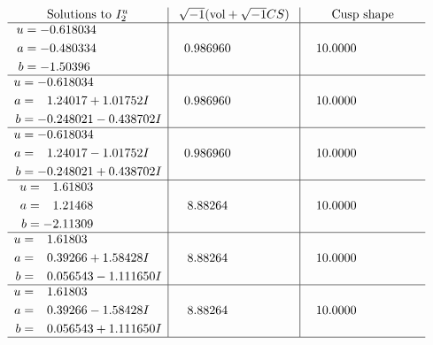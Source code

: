 \documentclass[1p]{elsarticle_modified}
\theoremstyle{definition}
\newcommand{\I}{\sqrt{-1}}
\begin{document}
$$\begin{array}{c|c|c}  
\text{Solutions to }I^u_{2}& \I (\text{vol} + \sqrt{-1}CS) & \text{Cusp shape}\\
 \hline 
\begin{aligned}
u &= -0.618034\phantom{ +0.000000I} \\
a &= -0.480334\phantom{ +0.000000I} \\
b &= -1.50396\phantom{ +0.000000I}\end{aligned}
 & \phantom{-}0.986960\phantom{ +0.000000I} & \phantom{-}10.0000\phantom{ +0.000000I} \\ \hline\begin{aligned}
u &= -0.618034\phantom{ +0.000000I} \\
a &= \phantom{-}1.24017 + 1.01752 I \\
b &= -0.248021 - 0.438702 I\end{aligned}
 & \phantom{-}0.986960\phantom{ +0.000000I} & \phantom{-}10.0000\phantom{ +0.000000I} \\ \hline\begin{aligned}
u &= -0.618034\phantom{ +0.000000I} \\
a &= \phantom{-}1.24017 - 1.01752 I \\
b &= -0.248021 + 0.438702 I\end{aligned}
 & \phantom{-}0.986960\phantom{ +0.000000I} & \phantom{-}10.0000\phantom{ +0.000000I} \\ \hline\begin{aligned}
u &= \phantom{-}1.61803\phantom{ +0.000000I} \\
a &= \phantom{-}1.21468\phantom{ +0.000000I} \\
b &= -2.11309\phantom{ +0.000000I}\end{aligned}
 & \phantom{-}8.88264\phantom{ +0.000000I} & \phantom{-}10.0000\phantom{ +0.000000I} \\ \hline\begin{aligned}
u &= \phantom{-}1.61803\phantom{ +0.000000I} \\
a &= \phantom{-}0.39266 + 1.58428 I \\
b &= \phantom{-}0.056543 - 1.111650 I\end{aligned}
 & \phantom{-}8.88264\phantom{ +0.000000I} & \phantom{-}10.0000\phantom{ +0.000000I} \\ \hline\begin{aligned}
u &= \phantom{-}1.61803\phantom{ +0.000000I} \\
a &= \phantom{-}0.39266 - 1.58428 I \\
b &= \phantom{-}0.056543 + 1.111650 I\end{aligned}
 & \phantom{-}8.88264\phantom{ +0.000000I} & \phantom{-}10.0000\phantom{ +0.000000I}\\
 \hline 
 \end{array}$$\newpage\newpage\renewcommand{\arraystretch}{1}
\end{document}
